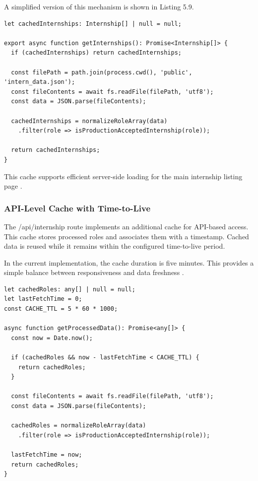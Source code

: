 A simplified version of this mechanism is shown in Listing 5.9.

\begin{lstlisting}[caption={Server-side internship catalog cache}]
let cachedInternships: Internship[] | null = null;

export async function getInternships(): Promise<Internship[]> {
  if (cachedInternships) return cachedInternships;

  const filePath = path.join(process.cwd(), 'public', 'intern_data.json');
  const fileContents = await fs.readFile(filePath, 'utf8');
  const data = JSON.parse(fileContents);

  cachedInternships = normalizeRoleArray(data)
    .filter(role => isProductionAcceptedInternship(role));

  return cachedInternships;
}
\end{lstlisting}

This cache supports efficient server-side loading for the main internship listing page \cite{smith1982cache}.

\subsubsection*{API-Level Cache with Time-to-Live}

The /api/internship route implements an additional cache for API-based access. This cache stores processed roles and associates them with a timestamp. Cached data is reused while it remains within the configured time-to-live period.

In the current implementation, the cache duration is five minutes. This provides a simple balance between responsiveness and data freshness \cite{smith1982cache, kleppmann2017designing}.

\begin{lstlisting}[caption={API cache with time-to-live}]
let cachedRoles: any[] | null = null;
let lastFetchTime = 0;
const CACHE_TTL = 5 * 60 * 1000;

async function getProcessedData(): Promise<any[]> {
  const now = Date.now();

  if (cachedRoles && now - lastFetchTime < CACHE_TTL) {
    return cachedRoles;
  }

  const fileContents = await fs.readFile(filePath, 'utf8');
  const data = JSON.parse(fileContents);

  cachedRoles = normalizeRoleArray(data)
    .filter(role => isProductionAcceptedInternship(role));

  lastFetchTime = now;
  return cachedRoles;
}
\end{lstlisting}

